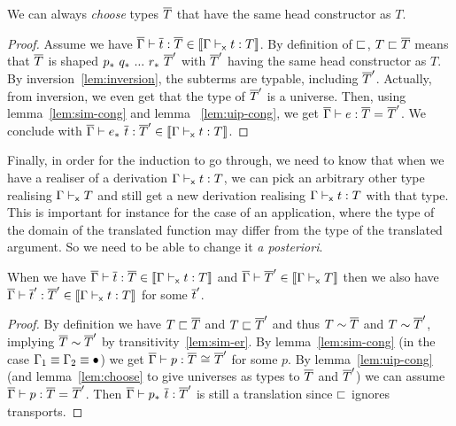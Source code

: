 \begin{lemma}
  \label{lem:choose}
  We can always \emph{choose} types $\overline{T}$ that have the same head constructor
  as $T$.
\end{lemma}

\begin{proof}
  Assume we have $\overline{\Gamma} \vdash \overline{t} : \overline{T} \in \llbracket \Gamma \vdash_{\mathsf{x}} t : T \rrbracket$.
  By definition of $\sqsubset$,
  $T \sqsubset \overline{T}$ means that $\overline{T}$ is shaped
  $\transpo{p}\ \transpo{q}\ ...\ \transpo{r}\ \Tb'$ with $\overline{T}'$ having
  the same head constructor as $T$. By inversion~\eqref{lem:inversion}, the
  subterms are typable, including $\overline{T}'$. Actually, from inversion, we
  even get that the type of $\overline{T}'$ is a universe. Then,
  using lemma~\ref{lem:sim-cong} and lemma~
  \ref{lem:uip-cong}, we get $\overline{\Gamma} \vdash e : \overline{T} =_{} \overline{T}'$.
  We conclude with
  $\isterm{\Gb}{\transpo{e}\ \tb}{\Tb'} \in \transl{\xisterm{\Ga}{t}{T}}$.
\end{proof}

Finally, in order for the induction to go through, we need to know
that when we have a realiser of a derivation $\Gamma \vdash_{\mathsf{x}} t : T$, we can
pick an arbitrary other type realising $\Gamma \vdash_{\mathsf{x}} T$ and still
get a new derivation realising $\Gamma \vdash_{\mathsf{x}} t : T$ with that type.
%
This is important for instance for the case of an application, where
the type of the domain of the translated function may differ from the
type of the translated argument. So we need to be able to change it \textit{a
posteriori}.


\begin{lemma}
  \label{lem:change-type}
  When we have $\overline{\Gamma} \vdash \overline{t} : \overline{T} \in \llbracket \Gamma \vdash_{\mathsf{x}} t : T \rrbracket$
  and $\overline{\Gamma} \vdash \overline{T}' \in \llbracket \Gamma \vdash_{\mathsf{x}} T \rrbracket$ then we also have
  $\overline{\Gamma} \vdash \overline{t}' : \overline{T}' \in \llbracket \Gamma \vdash_{\mathsf{x}} t : T \rrbracket$ for some $\overline{t}'$.
\end{lemma}

\begin{proof}
  By definition we have $T \sqsubset \overline{T}$ and $T \sqsubset \overline{T}'$ and thus $T \sim \overline{T}$ and
  $T \sim \overline{T}'$, implying $\overline{T} \sim \overline{T}'$ by transitivity~\eqref{lem:sim-er}.
  By lemma~\ref{lem:sim-cong}
  (in the case $\Gamma_1 \equiv \Gamma_2 \equiv \bullet$) we get
  $\overline{\Gamma} \vdash p : \overline{T} \mathrel{{}_{}{\cong}_{}} \overline{T}'$ for some $p$.
  By lemma~\ref{lem:uip-cong} (and lemma~\ref{lem:choose} to give
  universes as types to $\overline{T}$ and $\overline{T}'$) we can assume
  $\overline{\Gamma} \vdash p : \overline{T} =_{} \overline{T}'$. Then
  $\overline{\Gamma} \vdash p_*\ \overline{t} : \overline{T}'$ is still a translation since $\sqsubset$
  ignores transports.
\end{proof}

